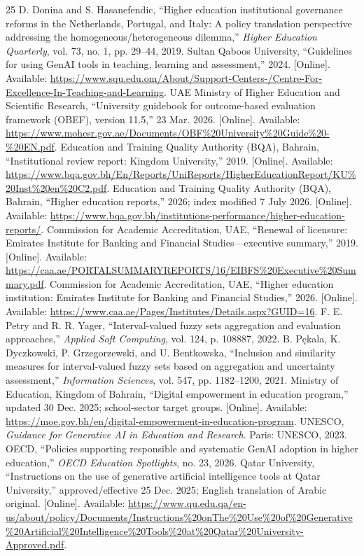 \documentclass[conference,letterpaper]{IEEEtran}
\begin{document}
\begin{thebibliography}{25}
 D. Donina and S. Hasanefendic, ``Higher education institutional governance reforms in the Netherlands, Portugal, and Italy: A policy translation perspective addressing the homogeneous/heterogeneous dilemma,'' \emph{Higher Education Quarterly}, vol. 73, no. 1, pp. 29--44, 2019.
 Sultan Qaboos University, ``Guidelines for using GenAI tools in teaching, learning and assessment,'' 2024. [Online]. Available: \url{https://www.squ.edu.om/About/Support-Centers-/Centre-For-Excellence-In-Teaching-and-Learning}.
 UAE Ministry of Higher Education and Scientific Research, ``University guidebook for outcome-based evaluation framework (OBEF), version 11.5,'' 23 Mar. 2026. [Online]. Available: \url{https://www.mohesr.gov.ae/Documents/OBF%20University%20Guide%20-%20EN.pdf}.
 Education and Training Quality Authority (BQA), Bahrain, ``Institutional review report: Kingdom University,'' 2019. [Online]. Available: \url{https://www.bqa.gov.bh/En/Reports/UniReports/HigherEducationReport/KU%20Inst%20en%20C2.pdf}.
 Education and Training Quality Authority (BQA), Bahrain, ``Higher education reports,'' 2026; index modified 7 July 2026. [Online]. Available: \url{https://www.bqa.gov.bh/institutions-performance/higher-education-reports/}.
 Commission for Academic Accreditation, UAE, ``Renewal of licensure: Emirates Institute for Banking and Financial Studies---executive summary,'' 2019. [Online]. Available: \url{https://caa.ae/PORTALSUMMARYREPORTS/16/EIBFS%20Executive%20Summary.pdf}.
 Commission for Academic Accreditation, UAE, ``Higher education institution: Emirates Institute for Banking and Financial Studies,'' 2026. [Online]. Available: \url{https://www.caa.ae/Pages/Institutes/Details.aspx?GUID=16}.
 F. E. Petry and R. R. Yager, ``Interval-valued fuzzy sets aggregation and evaluation approaches,'' \emph{Applied Soft Computing}, vol. 124, p. 108887, 2022.
 B. P\k{e}kala, K. Dyczkowski, P. Grzegorzewski, and U. Bentkowska, ``Inclusion and similarity measures for interval-valued fuzzy sets based on aggregation and uncertainty assessment,'' \emph{Information Sciences}, vol. 547, pp. 1182--1200, 2021.
 Ministry of Education, Kingdom of Bahrain, ``Digital empowerment in education program,'' updated 30 Dec. 2025; school-sector target groups. [Online]. Available: \url{https://moe.gov.bh/en/digital-empowerment-in-education-program}.
 UNESCO, \emph{Guidance for Generative AI in Education and Research}. Paris: UNESCO, 2023.
 OECD, ``Policies supporting responsible and systematic GenAI adoption in higher education,'' \emph{OECD Education Spotlights}, no. 23, 2026.
 Qatar University, ``Instructions on the use of generative artificial intelligence tools at Qatar University,'' approved/effective 25 Dec. 2025; English translation of Arabic original. [Online]. Available: \url{https://www.qu.edu.qa/en-us/about/policy/Documents/Instructions%20onThe%20Use%20of%20Generative%20Artificial%20Intelligence%20Tools%20at%20Qatar%20University-Approved.pdf}.
\end{thebibliography}
\end{document}
